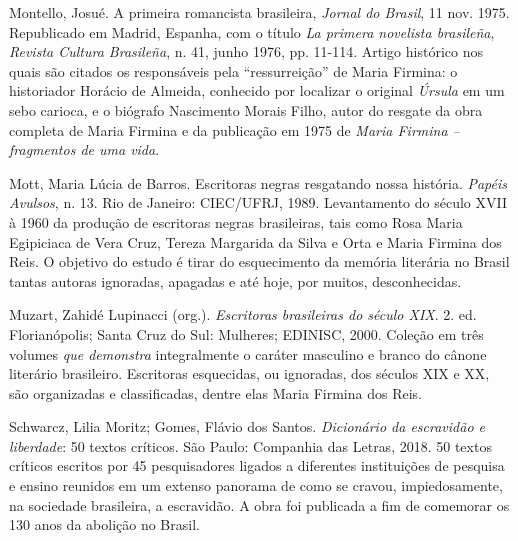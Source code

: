 \documentclass[12pt]{extarticle}
\begin{document}
Montello, Josué. A primeira romancista brasileira, \emph{Jornal do
Brasil}, 11 nov. 1975. Republicado em Madrid, Espanha, com o título
\emph{La primera novelista brasileña}, \emph{Revista Cultura Brasileña},
n. 41, junho 1976, pp. 11-114. Artigo histórico nos quais são citados os
responsáveis pela ``ressurreição'' de Maria Firmina: o historiador
Horácio de Almeida, conhecido por localizar o original \emph{Úrsula} em
um sebo carioca, e o biógrafo Nascimento Morais Filho, autor do resgate
da obra completa de Maria Firmina e da publicação em 1975 de \emph{Maria
Firmina -- fragmentos de uma vida}.

Mott, Maria Lúcia de Barros. Escritoras negras resgatando nossa
história. \emph{Papéis Avulsos}, n. 13. Rio de Janeiro: CIEC/UFRJ, 1989.
Levantamento do século XVII à 1960 da produção de escritoras negras
brasileiras, tais como Rosa Maria Egipiciaca de Vera Cruz, Tereza
Margarida da Silva e Orta e Maria Firmina dos Reis. O objetivo do estudo
é tirar do esquecimento da memória literária no Brasil tantas autoras
ignoradas, apagadas e até hoje, por muitos, desconhecidas.

Muzart, Zahidé Lupinacci (org.). \emph{Escritoras brasileiras do século
XIX}. 2. ed. Florianópolis; Santa Cruz do Sul: Mulheres; EDINISC, 2000.
Coleção em três volumes \emph{que demonstra} integralmente o caráter
masculino e branco do cânone literário brasileiro. Escritoras
esquecidas, ou ignoradas, dos séculos XIX e XX, são organizadas e
classificadas, dentre elas Maria Firmina dos Reis.

Schwarcz, Lilia Moritz; Gomes, Flávio dos Santos. \emph{Dicionário da
escravidão e liberdade}: 50 textos críticos. São Paulo: Companhia das
Letras, 2018. 50 textos críticos escritos por 45 pesquisadores ligados a
diferentes instituições de pesquisa e ensino reunidos em um extenso
panorama de como se cravou, impiedosamente, na sociedade brasileira, a
escravidão. A obra foi publicada a fim de comemorar os 130 anos da
abolição no Brasil.
\end{document}
